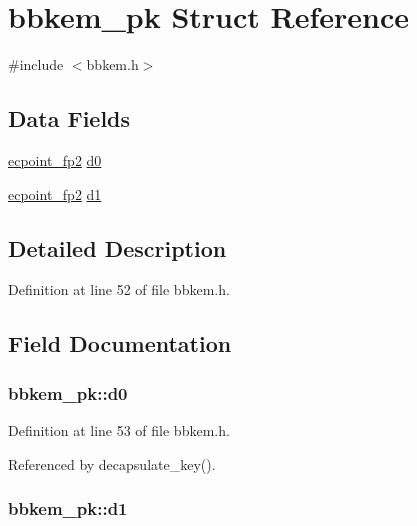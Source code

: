 \hypertarget{structbbkem__pk}{\section{bbkem\-\_\-pk Struct Reference}
\label{structbbkem__pk}
}


{\ttfamily \#include $<$bbkem.\-h$>$}

\subsection*{Data Fields}
\begin{DoxyCompactItemize}
\item 
\hyperlink{structecpoint__fp2}{ecpoint\-\_\-fp2} \hyperlink{structbbkem__pk_a74ba6a93c87bcfaba74f83add630dffc}{d0}
\item 
\hyperlink{structecpoint__fp2}{ecpoint\-\_\-fp2} \hyperlink{structbbkem__pk_af73cbd06ecfcc62fb80bb091c52eb215}{d1}
\end{DoxyCompactItemize}


\subsection{Detailed Description}


Definition at line 52 of file bbkem.\-h.



\subsection{Field Documentation}
\hypertarget{structbbkem__pk_a74ba6a93c87bcfaba74f83add630dffc}{
\subsubsection[{d0}]{ bbkem\-\_\-pk\-::d0}}\label{structbbkem__pk_a74ba6a93c87bcfaba74f83add630dffc}


Definition at line 53 of file bbkem.\-h.



Referenced by decapsulate\-\_\-key().

\hypertarget{structbbkem__pk_af73cbd06ecfcc62fb80bb091c52eb215}{
\subsubsection[{d1}]{ bbkem\-\_\-pk\-::d1}}\label{structbbkem__pk_af73cbd06ecfcc62fb80bb091c52eb215}


